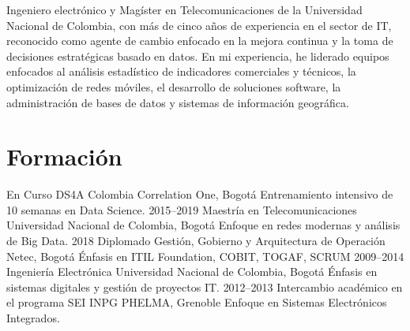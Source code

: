 \documentclass[11pt]{friggeri-cv} %
\begin{document}
Ingeniero electrónico y Magíster en Telecomunicaciones de la Universidad Nacional de Colombia, con más de cinco años de experiencia en el sector de IT, reconocido como agente de cambio enfocado en la mejora continua y la toma de decisiones estratégicas basado en datos. En mi experiencia, he liderado equipos enfocados al análisis estadístico de indicadores comerciales y técnicos, la optimización de redes móviles, el desarrollo de soluciones software, la administración de bases de datos y sistemas de información geográfica.
\section{Formación}
\begin{entrylist}
\entry
{En Curso}
{DS4A {\normalfont Colombia}}
{Correlation One, Bogotá}
{Entrenamiento intensivo de 10 semanas en Data Science.} 
\entry
{2015--2019}
{Maestría {\normalfont en Telecomunicaciones}}
{Universidad Nacional de Colombia, Bogotá}
{Enfoque en redes modernas y análisis de Big Data.} 
\entry
{2018}
{Diplomado {\normalfont Gestión, Gobierno y Arquitectura de Operación}}
{Netec, Bogotá}
{Énfasis en ITIL Foundation, COBIT, TOGAF, SCRUM}
\entry
{2009--2014}
{Ingeniería {\normalfont Electrónica}}
{Universidad Nacional de Colombia, Bogotá}
{Énfasis  en sistemas digitales y gestión de proyectos IT.}
\entry
{2012--2013}
{Intercambio académico {\normalfont en el programa SEI}}
{INPG PHELMA, Grenoble}
{Enfoque en Sistemas Electrónicos Integrados.}
\end{entrylist}
\end{document}
